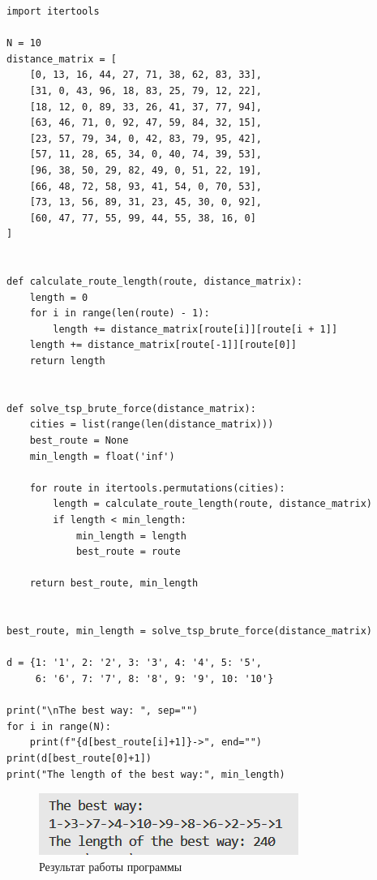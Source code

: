 \begin{lstlisting}
import itertools

N = 10
distance_matrix = [
    [0, 13, 16, 44, 27, 71, 38, 62, 83, 33],
    [31, 0, 43, 96, 18, 83, 25, 79, 12, 22],
    [18, 12, 0, 89, 33, 26, 41, 37, 77, 94],
    [63, 46, 71, 0, 92, 47, 59, 84, 32, 15],
    [23, 57, 79, 34, 0, 42, 83, 79, 95, 42],
    [57, 11, 28, 65, 34, 0, 40, 74, 39, 53],
    [96, 38, 50, 29, 82, 49, 0, 51, 22, 19],
    [66, 48, 72, 58, 93, 41, 54, 0, 70, 53],
    [73, 13, 56, 89, 31, 23, 45, 30, 0, 92],
    [60, 47, 77, 55, 99, 44, 55, 38, 16, 0]
]


def calculate_route_length(route, distance_matrix):
    length = 0
    for i in range(len(route) - 1):
        length += distance_matrix[route[i]][route[i + 1]]
    length += distance_matrix[route[-1]][route[0]]  
    return length


def solve_tsp_brute_force(distance_matrix):
    cities = list(range(len(distance_matrix)))
    best_route = None
    min_length = float('inf')
    
    for route in itertools.permutations(cities):
        length = calculate_route_length(route, distance_matrix)
        if length < min_length:
            min_length = length
            best_route = route
            
    return best_route, min_length


best_route, min_length = solve_tsp_brute_force(distance_matrix)

d = {1: '1', 2: '2', 3: '3', 4: '4', 5: '5', 
     6: '6', 7: '7', 8: '8', 9: '9', 10: '10'}

print("\nThe best way: ", sep="")
for i in range(N):
    print(f"{d[best_route[i]+1]}->", end="")
print(d[best_route[0]+1])
print("The length of the best way:", min_length)
\end{lstlisting}
\newpage
\begin{figure}[h]
\centering
\includegraphics[]{комивояжер.png}
\centering
\caption{Результат работы программы}
\end{figure}